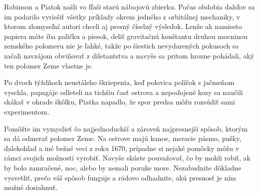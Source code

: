 Robinson a Piatok našli vo fľaši starú nábojovú zbierku. Počas obdobia
dažďov sa im podarilo vyriešiť všetky príklady okrem jedného z
orbitálnej mechaniky, v ktorom zlomyseľní autori chceli aj presný
číselný výsledok. Lenže ak namiesto papiera máte iba paličku a piesok,
deliť gravitačnú konštantu druhou mocninou zemského polomeru nie je
ľahké, takže po šiestich nevydarených pokusoch sa začali navzájom
obviňovať z diletantstva a navyše sa pritom hrozne pohádali, aký ten
polomer Zeme vlastne je.

Po dvoch týždňoch neustáleho škriepenia, keď polovica políčok s jačmeňom
vyschla, papagáje odleteli na tichšiu časť ostrova a nepodojené kozy sa
naučili skákať v ohrade škôlku, Piatka napadlo, že spor predsa môžu
rozsúdiť sami experimentom.

Pomôžte im vymyslieť čo najjednoduchší a zároveň najpresnejší spôsob,
ktorým sa dá odmerať polomer Zeme. Na ostrove majú kanoe, meracie pásmo,
pušky, ďalekohľad a iné bežné veci z roku 1670, prípadne si nejaké
pomôcky môžu v rámci svojich možností vyrobiť. Navyše skúste pouvažovať,
čo by mohli robiť, ak by bolo zamračené, noc, alebo by nemali poruke
more. Nezabudnite dôkladne vysvetliť, prečo váš spôsob funguje a rádovo
odhadnite, akú presnosť je ním možné dosiahnuť.
